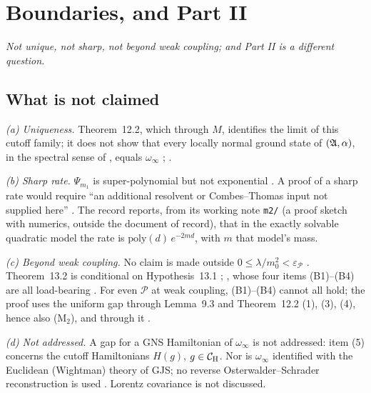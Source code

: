 \section{Boundaries, and Part II}\label{sec:boundaries}

\emph{Not unique, not sharp, not beyond weak coupling; and Part II is a different
question.}

\subsection{What is not claimed}\label{sec:notclaimed}

\emph{(a) Uniqueness.} Theorem~12.2, which  through $M$,
identifies the limit of this cutoff family; it does not show that every locally normal ground state of $(\mathfrak{A},\alpha)$, in the spectral sense
of , equals $\omega_\infty$ ;
.

\emph{(b) Sharp rate.} $\Psi_{m_1}$ is super-polynomial but not exponential
. A proof of a sharp rate would require ``an additional resolvent or
Combes--Thomas input not supplied here'' . The record
reports, from its working note \texttt{m2/} (a proof sketch with numerics, outside the
document of record), that in the exactly solvable quadratic model the rate is
$\mathrm{poly}(d)\,e^{-2md}$, with $m$ that model's mass.

\emph{(c) Beyond weak coupling.} No claim is made outside
$0\le\lambda/m_0^2<\varepsilon_{\mathscr P}$ . Theorem~13.2 is
conditional on Hypothesis~13.1 ;
, whose four items
(B1)--(B4) are all load-bearing . For even $\mathscr P$ at weak coupling,
(B1)--(B4) cannot all hold; the proof uses the uniform gap through Lemma~9.3 and
Theorem~12.2 (1), (3), (4), hence also (M$_2$), and through it .

\emph{(d) Not addressed.} A gap for a GNS Hamiltonian of $\omega_\infty$ is not
addressed: item (5) concerns the cutoff Hamiltonians $H(g)$, $g\in\mathcal{C}_{\mathrm H}$. Nor is
$\omega_\infty$ identified with the Euclidean (Wightman) theory of GJS; no reverse
Osterwalder--Schrader reconstruction is used . Lorentz covariance is not
discussed.

